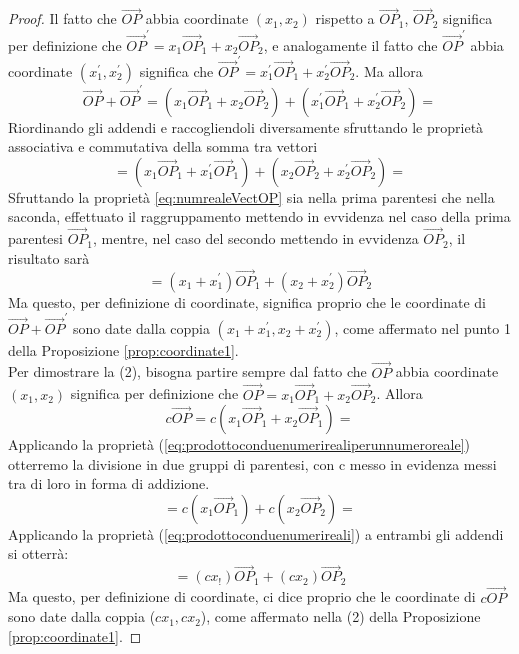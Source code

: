 \begin{proof}
  Il fatto che $\vec{OP}$ abbia coordinate $(x_1,x_2)$ rispetto a $\vec{OP}_1$, $\vec{OP}_2$ significa per definizione che $\vec{OP}^\prime= x_1\vec{OP}_1+x_2\vec{OP}_2$, e analogamente il fatto che $\vec{OP}^\prime$ abbia coordinate $(x^\prime_1,x^\prime_2)$ significa che $\vec{OP}^\prime= x^\prime_1\vec{OP}_1+x^\prime_2\vec{OP}_2$. Ma allora
  \begin{equation*}
    \vec{OP}+\vec{OP}^\prime=(x_1\vec{OP}_1+x_2\vec{OP}_2)+(x^\prime_1\vec{OP}_1+x^\prime_2\vec{OP}_2)=
  \end{equation*}
  Riordinando gli addendi e raccogliendoli diversamente sfruttando le proprietà associativa e commutativa della somma tra vettori
  \begin{equation*}
    =(x_1\vec{OP}_1+x^\prime_1\vec{OP}_1)+(x_2\vec{OP}_2+x^\prime_2\vec{OP}_2)=
  \end{equation*}
  Sfruttando la proprietà \ref{eq:numrealeVectOP} sia nella prima parentesi che nella saconda, effettuato il raggruppamento mettendo in evvidenza nel caso della prima parentesi $\vec{OP}_1$, mentre, nel caso del secondo mettendo in evvidenza $\vec{OP}_2$, il risultato sarà
  \begin{equation*}
    =(x_1+x^\prime_1)\vec{OP}_1+(x_2+x^\prime_2)\vec{OP}_2
  \end{equation*}
  Ma questo, per definizione di coordinate, significa proprio che le coordinate di $\vec{OP}+\vec{OP}^\prime$ sono date dalla coppia $(x_1+x^\prime_1,x_2+x^\prime_2)$, come affermato nel punto 1 della Proposizione \ref{prop:coordinate1}.\\
  Per dimostrare la (2), bisogna partire sempre dal fatto che $\vec{OP}$ abbia coordinate $(x_1,x_2)$ significa per definizione che $\vec{OP}= x_1\vec{OP}_1+x_2\vec{OP}_2$. Allora
  \begin{equation*}
    c\vec{OP}=c(x_1\vec{OP}_1+x_2\vec{OP}_1)=
  \end{equation*}
  Applicando la proprietà (\ref{eq:prodottoconduenumerirealiperunnumeroreale}) otterremo la divisione in due gruppi di parentesi, con c messo in evidenza messi tra di loro in forma di addizione.
  \begin{equation*}
    =c(x_1\vec{OP}_1)+c(x_2\vec{OP}_2)=
  \end{equation*}
  Applicando la proprietà (\ref{eq:prodottoconduenumerireali}) a entrambi gli addendi si otterrà:
  \begin{equation*}
    =(cx_!)\vec{OP}_1+(cx_2)\vec{OP}_2
  \end{equation*}
  Ma questo, per definizione di coordinate, ci dice proprio che le coordinate di $c\vec{OP}$ sono date dalla coppia ($cx_1,cx_2$), come affermato nella (2) della  Proposizione \ref{prop:coordinate1}.
\end{proof}
